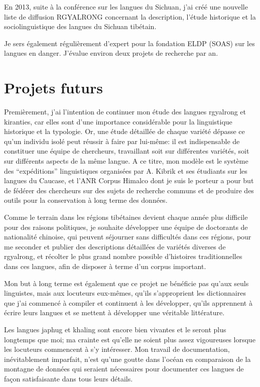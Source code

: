 \documentclass[oldfontcommands,oneside,a4paper,11pt]{memoir}
\begin{document}
 En 2013, suite à la conférence sur les langues du Sichuan, j'ai créé une nouvelle liste de diffusion RGYALRONG concernant la description, l'étude historique et la sociolinguistique des langues du Sichuan tibétain.

Je sers également régulièrement d'expert pour la fondation ELDP (SOAS) sur les langues en danger. J'évalue environ deux projets de recherche par an.

\chapter{Projets futurs}


Premièrement, j'ai l'intention de continuer mon étude des langues rgyalrong et kiranties, car elles sont d'une importance considérable pour la linguistique historique et la typologie. Or, une étude détaillée de chaque variété dépasse ce qu'un individu isolé peut réussir à faire par lui-même: il est indispensable de constituer une équipe de chercheurs, travaillant soit sur différentes variétés, soit sur différents aspects de la même langue. A ce titre, mon modèle est le système des ``expéditions'' linguistiques organisées par A. Kibrik et ses étudiants sur les langues du Caucase, et l'ANR Corpus Himalco dont je suis le porteur a pour but de fédérer des chercheurs sur des sujets de recherche communs et de produire des outils pour la conservation à long terme des données.

Comme le terrain dans les régions tibétaines devient chaque année plus difficile pour des raisons politiques, je souhaite développer une équipe de doctorants de nationalité chinoise, qui peuvent séjourner sans difficultés dans ces régions, pour me seconder et publier des descriptions détaillées de variétés diverses de rgyalrong, et récolter le plus grand nombre possible d'histoires traditionnelles dans ces langues, afin de disposer à terme d'un corpus important.

Mon but à long terme est également que ce projet ne bénéficie pas qu'aux seuls linguistes, mais aux locuteurs eux-mêmes, qu'ils s'approprient les  dictionnaires que j'ai commencé à compiler et continuent à les développer, qu'ils apprennent à écrire leurs langues et se mettent à développer une véritable littérature. 

Les langues japhug et khaling sont encore bien vivantes et le seront plus longtemps que moi; ma crainte est qu'elle ne soient plus assez vigoureuses lorsque les locuteurs commencent à s'y intéresser. Mon travail de documentation, inévitablement imparfait, n'est qu'une goutte dans l'océan en comparaison de la montagne de données qui seraient nécessaires pour documenter ces langues de façon satisfaisante dans tous leurs détails. 
\end{document}
